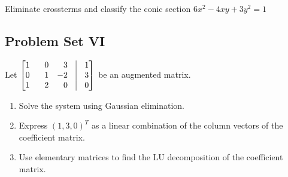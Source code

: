 \documentclass[crop=false,class=book,oneside]{standalone}
\begin{document}
        \begin{problem}
        Eliminate crossterms and classify the conic section $6x^2 - 4xy+3y^2 = 1$
        \end{problem}
        \newpage
        \subsection{Problem Set VI}
        \begin{problem}
        Let $\begin{bmatrix*}[r] 1 & 0 & 3 & \vline & 1 \\ 0 & \phantom{-}1 & -2 & \vline & 3 \\ 1 & 2 & 0 & \vline & 0 \end{bmatrix*}$ be an augmented matrix.
        \begin{enumerate}
            \item Solve the system using Gaussian elimination.
            \item Express $(1,3,0)^{T}$ as a linear combination of the column vectors of the coefficient matrix.
            \item Use elementary matrices to find the LU decomposition of the coefficient matrix.
        \end{enumerate}
        \end{problem}
\end{document}
